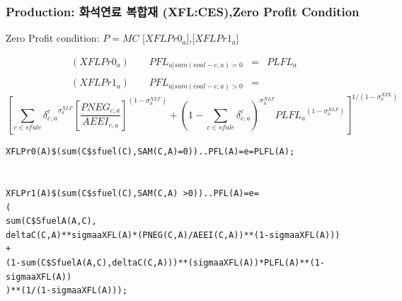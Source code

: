 \documentclass[10pt,compress,slidetop,%
			   hyperref={unicode},xcolor={svgnames},%
			   t]{beamer}
\begin{document}
\begin{frame}[fragile]
\frametitle{Production: 화석연료 복합재 (XFL:CES),Zero Profit Condition}
\begin{scriptsize}
Zero Profit condition: $P=MC$ [$XFLPr0_a$],[$XFLPr1_a$]

\begin{eqnarray*}
(XFLPr0_a)\qquad PFL_{a|sam(coal-c,a)=0}&=&PLFL_a\\
& &\\
(XFLPr1_a)\qquad PFL_{a|sam(coal-c,a)>0}&=&
\end{eqnarray*}
\begin{displaymath}
\left[\sum_{c\in sfule}{\delta^c_{c,a}}^{\sigma^{XLF}_a}\left[\frac{PNEG_{c,a}}{AEEI_{c,a}}\right]^{(1-\sigma^{XLF}_a)}+(1-\sum_{c\in sfule}\delta^c_{c,a})^{\sigma^{XLF}_a}{PLFL_a}^{(1-\sigma^{XLF}_a)}\right]^{1/(1-\sigma^{XFL}_a)}
\end{displaymath}

\begin{verbatim}
XFLPr0(A)$(sum(C$sfuel(C),SAM(C,A)=0))..PFL(A)=e=PLFL(A);


XFLPr1(A)$(sum(C$sfuel(C),SAM(C,A) >0))..PFL(A)=e=
(
sum(C$SfuelA(A,C),
deltaC(C,A)**sigmaaXFL(A)*(PNEG(C,A)/AEEI(C,A))**(1-sigmaaXFL(A)))
+
(1-sum(C$SfuelA(A,C),deltaC(C,A)))**(sigmaaXFL(A))*PLFL(A)**(1-sigmaaXFL(A))
)**(1/(1-sigmaaXFL(A)));

\end{verbatim}
\end{scriptsize}
\end{frame}
\end{document}
